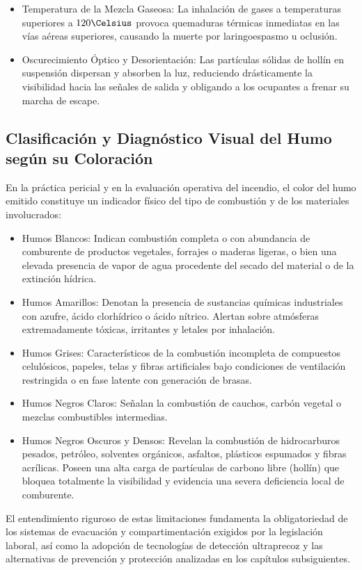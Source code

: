 \begin{itemize}
          taquicardia y mareos, y una concentración menor al $6\percent$ causa la detención respiratoria en pocos segundos.
    \item Temperatura de la Mezcla Gaseosa: La inhalación de gases a temperaturas superiores a $120\Celsius$ provoca
          quemaduras térmicas inmediatas en las vías aéreas superiores, causando la muerte por laringoespasmo u oclusión.
    \item Oscurecimiento Óptico y Desorientación: Las partículas sólidas de hollín en suspensión dispersan y absorben la
          luz, reduciendo drásticamente la visibilidad hacia las señales de salida y obligando a los ocupantes a frenar su
          marcha de escape.
\end{itemize}

\subsection{Clasificación y Diagnóstico Visual del Humo según su Coloración}

En la práctica pericial y en la evaluación operativa del incendio, el color del humo emitido constituye un indicador
físico del tipo de combustión y de los materiales involucrados:

\begin{itemize}
    \item Humos Blancos: Indican combustión completa o con abundancia de comburente de productos vegetales, forrajes o
          maderas ligeras, o bien una elevada presencia de vapor de agua procedente del secado del material o de la
          extinción hídrica.
    \item Humos Amarillos: Denotan la presencia de sustancias químicas industriales con azufre, ácido clorhídrico o
          ácido nítrico. Alertan sobre atmósferas extremadamente tóxicas, irritantes y letales por inhalación.
    \item Humos Grises: Característicos de la combustión incompleta de compuestos celulósicos, papeles, telas y fibras
          artificiales bajo condiciones de ventilación restringida o en fase latente con generación de brasas.
    \item Humos Negros Claros: Señalan la combustión de cauchos, carbón vegetal o mezclas combustibles intermedias.
    \item Humos Negros Oscuros y Densos: Revelan la combustión de hidrocarburos pesados, petróleo, solventes orgánicos,
          asfaltos, plásticos espumados y fibras acrílicas. Poseen una alta carga de partículas de carbono libre (hollín)
          que bloquea totalmente la visibilidad y evidencia una severa deficiencia local de comburente.
\end{itemize}

El entendimiento riguroso de estas limitaciones fundamenta la obligatoriedad de los sistemas de evacuación y
compartimentación exigidos por la legislación laboral, así como la adopción de tecnologías de detección ultraprecoz y
las alternativas de prevención y protección analizadas en los capítulos subsiguientes.

